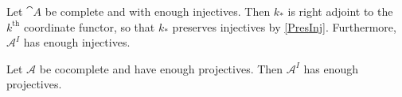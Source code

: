 \begin{exercise}
	Let $\cat{A}$ be complete and with enough injectives.
	Then $k_*$ is right adjoint to the $k^\text{th}$ coordinate functor, so that $k_*$ preserves injectives by \ref{PresInj}.
	Furthermore, $\mathcal{A}^I$ has enough injectives.
\end{exercise}

\begin{exercise}
	Let $\mathcal{A}$ be cocomplete and have enough projectives.
	Then $\mathcal{A}^I$ has enough projectives.
\end{exercise}